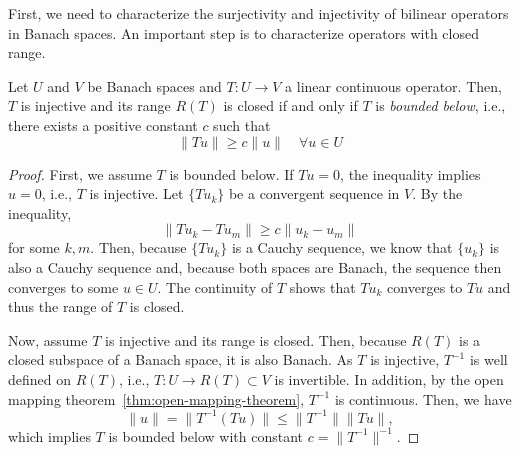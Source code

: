 First, we need to characterize the surjectivity and injectivity of bilinear operators in Banach spaces. An important step is to characterize operators with closed range. 
\begin{lemma}
    Let $U$ and $ V$ be Banach spaces and $T:U\to V$ a linear continuous operator. Then, $T$ is injective and its range $R(T)$ is closed if and only if  $T$ is \emph{bounded below}, i.e., there exists a positive constant $c$ such that 
    \begin{equation}
        \| Tu \| \ge c\| u \|\quad \forall u\in U
    \end{equation}
    \begin{proof}
        First, we assume $T$ is bounded below. If $Tu=0$, the inequality implies $u=0$, i.e., $T$ is injective. Let $\{Tu_k\}$ be a convergent sequence in $V$. By the inequality,
        \begin{equation}
            \| Tu_k - Tu_m \| \ge c\| u_k - u_m \|
        \end{equation}
        for some $k,m$. Then, because $\{Tu_k\}$ is a Cauchy sequence, we know that $\{u_k\}$ is also a Cauchy sequence and, because both spaces are Banach, the sequence then converges to some $u\in U$. The continuity of $T$ shows that $Tu_k$ converges to $Tu$ and thus the range of $T$ is closed. 

        Now, assume $T$ is injective and its range is closed. Then, because $R(T)$ is a closed subspace of a Banach space, it is also Banach. As $ T$ is injective, $T^{-1}$ is well defined on $R(T)$, i.e., $T:U\to R(T)\subset V$ is invertible. In addition, by the open mapping theorem~\ref{thm:open-mapping-theorem}, $T^{-1}$ is continuous. Then, we have
        \begin{equation}
            \| u \| = \| T^{-1}(Tu) \| 
            \le \| T^{-1} \| \| Tu \|,
        \end{equation}
        which implies $T$ is bounded below with constant $c = \| T^{-1} \|^{-1}$.
    \end{proof}
\end{lemma}

